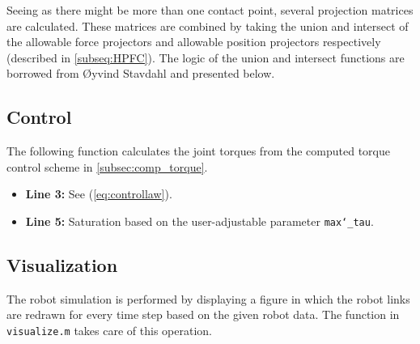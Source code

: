 

Seeing as there might be more than one contact point, several projection matrices are calculated. These matrices are combined by taking the union and intersect of the allowable force projectors and allowable position projectors respectively (described in \ref{subseq:HPFC}). The logic of the union and intersect functions are borrowed from Øyvind Stavdahl and presented below.\\





\subsection{Control}
The following function calculates the joint torques from the computed torque control scheme in \ref{subsec:comp_torque}.

\begin{itemize}
    \item \textbf{Line 3:} See (\ref{eq:controllaw}).
    \item \textbf{Line 5:} Saturation based on the user-adjustable parameter \texttt{max\char`_tau}.
\end{itemize}


\clearpage
\subsection{Visualization}

The robot simulation is performed by displaying a figure in which the robot links are redrawn for every time step based on the given robot data. The function in \texttt{visualize.m} takes care of this operation.
